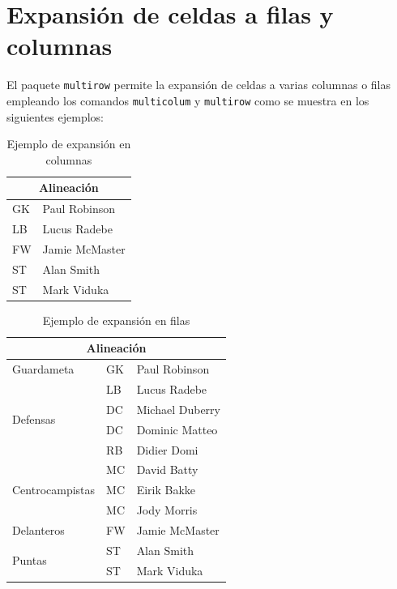 \documentclass[11pt,a4paper]{article}
\begin{document}
\section{Expansión de celdas a filas y columnas}
El paquete \texttt{multirow} permite la expansión de celdas a varias columnas o filas empleando los comandos \texttt{multicolum} y \texttt{multirow} como se muestra en los siguientes ejemplos:

\begin{table}[H]%
	\centering
	\caption{Ejemplo de expansión en columnas}
	\label{tab:expcolumnas}
	\begin{tabular}{|l|l|} %
	\hline
	\multicolumn{2}{|c|}{Alineación} \\
	\hline
	GK & Paul Robinson \\
	LB & Lucus Radebe \\
	FW & Jamie McMaster \\
	ST & Alan Smith \\
	ST & Mark Viduka \\
	\hline
	\end{tabular}
\end{table}

\begin{table}[H]%
	\centering
	\caption{Ejemplo de expansión en filas}
	\label{tab:expfilas}
	\begin{tabular}{|l|l|l|} %
	\hline
	\multicolumn{3}{|c|}{Alineación} \\
	\hline
	Guardameta & GK & Paul Robinson \\ \hline
	\multirow{4}{*}{Defensas} & LB & Lucus Radebe \\
	 & DC & Michael Duberry \\
	 & DC & Dominic Matteo \\
	 & RB & Didier Domi \\ \hline
	\multirow{3}{*}{Centrocampistas} & MC & David Batty \\
	 & MC & Eirik Bakke \\
	 & MC & Jody Morris \\ \hline
	Delanteros & FW & Jamie McMaster \\ \hline
	\multirow{2}{*}{Puntas} & ST & Alan Smith \\
	 & ST & Mark Viduka \\
	\hline
	\end{tabular}
\end{table}
\end{document}
